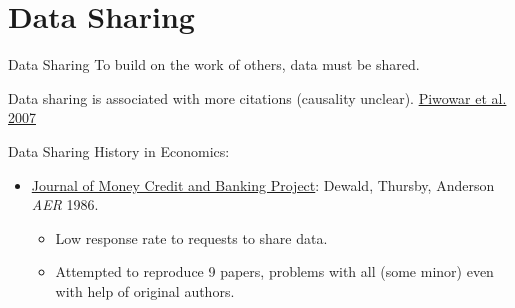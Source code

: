 \documentclass{beamer}
\begin{document}
\section{Data Sharing}
\begin{frame}{Data Sharing}
To build on the work of others, data must be shared.

Data sharing is associated with more citations (causality unclear). \href{http://journals.plos.org/plosone/article?id=10.1371/journal.pone.0000308}{Piwowar et al. 2007} 
\end{frame}

\begin{frame}{Data Sharing}
History in Economics:
\begin{itemize}
\item  \href{http://www.jstor.org/stable/1806061}{Journal of Money Credit and Banking Project}: Dewald, Thursby, Anderson \textit{AER} 1986. 
\begin{itemize}
\item Low response rate to requests to share data.
\item Attempted to reproduce 9 papers, problems with all (some minor) even with help of original authors.
\end{itemize}
\end{itemize}
\end{frame}


{ %
    \begin{frame}[plain]
     \end{frame}
}
\end{document}

